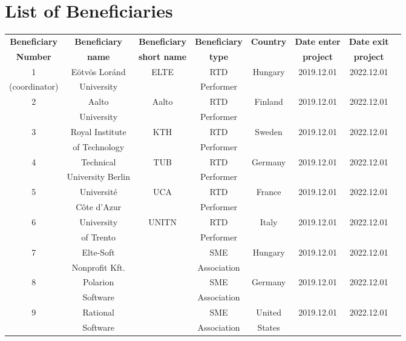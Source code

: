 \section{List of Beneficiaries}


\begin{center}
	\begin{adjustbox}{width=1\textwidth}
		\begin{tabular}{ |c|c|c|c|c|c|c|c|} 
			\hline
			\textbf{Beneficiary} & \textbf{Beneficiary} & \textbf{Beneficiary} & \textbf{Beneficiary} & \textbf{Country} & \textbf{Date enter} & \textbf{Date exit} \\
			\textbf{Number} & \textbf{name} & \textbf{short name} & \textbf{type} & ~ & \textbf{project} & \textbf{project} \\
			\hline
			
			1 & Eötvös Loránd & ELTE & RTD & Hungary & 2019.12.01 & 2022.12.01 \\
			(coordinator) & University & ~ & Performer & ~ & ~ & ~ \\
			\hline
			
			2 & Aalto & Aalto & RTD  & Finland & 2019.12.01 & 2022.12.01 \\
			~ & University & ~ & Performer & ~ & ~ & ~ \\
			\hline
			
			3 & Royal Institute & KTH & RTD  & Sweden & 2019.12.01 & 2022.12.01 \\
			~ & of Technology &  ~ & Performer & ~ & ~ & ~ \\
			\hline
			
			4 & Technical & TUB & RTD  & Germany & 2019.12.01 & 2022.12.01 \\
			~ & University Berlin &  ~ & Performer & ~ & ~ & ~ \\
			\hline
			
			5 & Université & UCA & RTD  & France & 2019.12.01 & 2022.12.01 \\
			~ & Côte d’Azur &  ~ & Performer & ~ & ~ & ~ \\
			\hline
			
			6 & University & UNITN & RTD  & Italy & 2019.12.01 & 2022.12.01 \\
			~ & of Trento &  ~ & Performer & ~ & ~ & ~ \\
			\hline
			
			7 & Elte-Soft & ~ & SME  & Hungary & 2019.12.01 & 2022.12.01 \\
			~ & Nonprofit Kft. &  ~ & Association & ~ & ~ & ~ \\
			\hline
			
			8 & Polarion & ~ & SME  & Germany & 2019.12.01 & 2022.12.01 \\
			~ & Software &  ~ & Association & ~ & ~ & ~ \\
			\hline
			
			9 & Rational & ~ & SME & United & 2019.12.01 & 2022.12.01 \\
			~ & Software &  ~ & Association & States & ~ & ~ \\
			\hline
		\end{tabular}
	\end{adjustbox}
\end{center}
